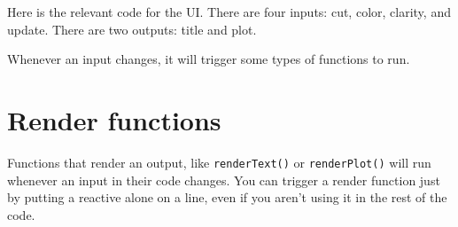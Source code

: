 \documentclass[
  oneside]{book}
\newenvironment{Shaded}{\begin{snugshade}}{\end{snugshade}}
\newcommand{\AttributeTok}[1]{\textcolor[rgb]{0.77,0.63,0.00}{#1}}
\newcommand{\ConstantTok}[1]{\textcolor[rgb]{0.00,0.00,0.00}{#1}}
\newcommand{\FunctionTok}[1]{\textcolor[rgb]{0.00,0.00,0.00}{#1}}
\newcommand{\NormalTok}[1]{#1}
\newcommand{\SpecialCharTok}[1]{\textcolor[rgb]{0.00,0.00,0.00}{#1}}
\newcommand{\StringTok}[1]{\textcolor[rgb]{0.31,0.60,0.02}{#1}}
\begin{document}
Here is the relevant code for the UI. There are four inputs: cut, color, clarity, and update. There are two outputs: title and plot.

\begin{Shaded}
\end{Shaded}

Whenever an input changes, it will trigger some types of functions to run.

\hypertarget{render-functions}{%
\section{Render functions}\label{render-functions}}

Functions that render an output, like \texttt{renderText}\texttt{()} or \texttt{renderPlot}\texttt{()} will run whenever an input in their code changes. You can trigger a render function just by putting a reactive alone on a line, even if you aren't using it in the rest of the code.
\end{document}
